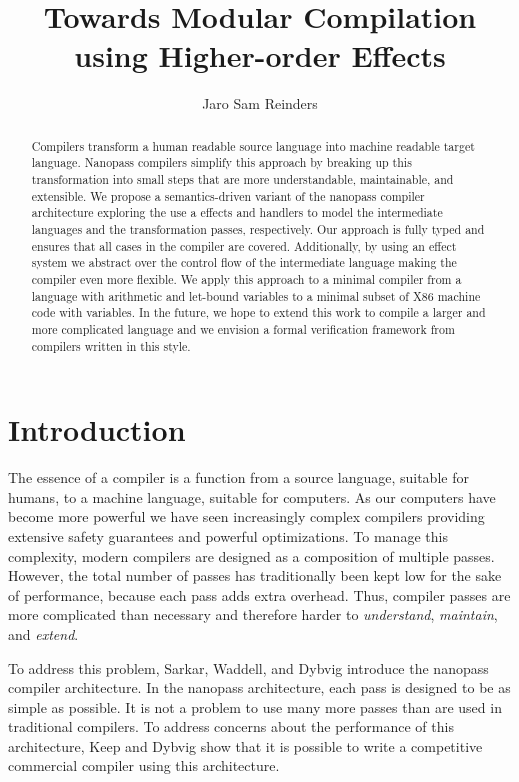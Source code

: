 \documentclass[a4paper,UKenglish,cleveref, autoref, thm-restate, anonymous]{oasics-v2021}
\title{Towards Modular Compilation using Higher-order Effects}
\author{Jaro Sam Reinders}{Delft University of Technology, Netherlands}{j.s.reinders@tudelft.nl}{https://orcid.org/0000-0002-6837-3757}{} %
\begin{document}
\maketitle

\begin{abstract}
  Compilers transform a human readable source language into machine readable target language.
  Nanopass compilers simplify this approach by breaking up this transformation into small steps that are more understandable, maintainable, and extensible.
  We propose a semantics-driven variant of the nanopass compiler architecture exploring the use a effects and handlers to model the intermediate languages and the transformation passes, respectively.
  Our approach is fully typed and ensures that all cases in the compiler are covered.
  Additionally, by using an effect system we abstract over the control flow of the intermediate language making the compiler even more flexible.
  We apply this approach to a minimal compiler from a language with arithmetic and let-bound variables to a minimal subset of X86 machine code with variables.
  In the future, we hope to extend this work to compile a larger and more complicated language and we envision a formal verification framework from compilers written in this style.
\end{abstract}

\section{Introduction}

The essence of a compiler is a function from a source language, suitable for humans, to a machine language, suitable for computers.
As our computers have become more powerful we have seen increasingly complex compilers providing extensive safety guarantees and powerful optimizations.
To manage this complexity, modern compilers are designed as a composition of multiple passes.
However, the total number of passes has traditionally been kept low for the sake of performance, because each pass adds extra overhead.
Thus, compiler passes are more complicated than necessary and therefore harder to \emph{understand}, \emph{maintain}, and \emph{extend}.

To address this problem, Sarkar, Waddell, and Dybvig \cite{10.1145/1016850.1016878} introduce the nanopass compiler architecture.
In the nanopass architecture, each pass is designed to be as simple as possible.
It is not a problem to use many more passes than are used in traditional compilers. 
To address concerns about the performance of this architecture, Keep and Dybvig \cite{10.1145/2544174.2500618} show that it is possible to write a competitive commercial compiler using this architecture.
\end{document}
